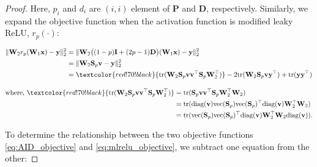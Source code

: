 \begin{proof}
    Here, $p_i$ and $d_i$ are $(i,i)$ element of $\mathbf{P}$ and $\mathbf{D}$, respectively. Similarly, we expand the objective function when the activation function is modified leaky ReLU, $r_p(\cdot)$:

\begin{align}
    \|\mathbf{W}_2 r_p(\mathbf{W}_1 \mathbf{x}) - \mathbf{y}\|_2^2
    &= \|\mathbf{W}_2 \big((1-p)\mathbf{I} + (2p-1)\mathbf{D}\big)(\mathbf{W}_1 \mathbf{x}) - \mathbf{y}\|_2^2 \label{eq:mlrelu_objective}\\
    &= \|\mathbf{W}_2 \mathbf{S}_p \mathbf{v} - \mathbf{y}\|_2^2 \nonumber\\
    &= \textcolor{red!70!black}{\text{tr}(\mathbf{W}_2 \mathbf{S}_p \mathbf{v} \mathbf{v}^\top \mathbf{S}_p \mathbf{W}_2^\top)} 
       - 2 \text{tr}(\mathbf{W}_2 \mathbf{S}_p \mathbf{v} \mathbf{y}^\top) 
       + \text{tr}(\mathbf{y} \mathbf{y}^\top) \nonumber
\end{align}


\begin{align*}
    \text{where, }\textcolor{red!70!black}{\text{tr}(\mathbf{W}_2 \mathbf{S}_p \mathbf{v} \mathbf{v}^\top \mathbf{S}_p \mathbf{W}_2^\top)}
    &= \text{tr}(\mathbf{S}_p \mathbf{v} \mathbf{v}^\top \mathbf{S}_p \mathbf{W}_2^\top \mathbf{W}_2) \\
    &= \text{tr}(\text{diag}(\mathbf{v}) \text{vec}(\mathbf{S}_p)\text{vec}(\mathbf{S}_p)^\top \text{diag}(\mathbf{v}) \mathbf{W}_2^\top \mathbf{W}_2) \\
    &= \text{tr}(\text{vec}(\mathbf{S}_p)\text{vec}(\mathbf{S}_p)^\top \text{diag}(\mathbf{v}) \mathbf{W}_2^\top \mathbf{W}_2 \text{diag}(\mathbf{v})).
\end{align*}

    To determine the relationship between the two objective functions \eqref{eq:AID_objective} and \eqref{eq:mlrelu_objective}, we subtract one equation from the other:


\end{proof}
